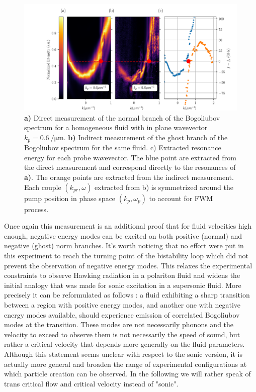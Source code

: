 \begin{figure}
    \centering
    \includegraphics[width=1\textwidth]{chap_custom_st/fig/supersonic_homogenous.pdf}
    \caption{\textbf{a)} Direct measurement of the normal branch of the Bogoliubov spectrum for a homogeneous fluid with in plane wavevector $k_p=\SI{0.6}{\per \micro \meter}.$ \textbf{b)} Indirect measurement of the ghost branch of the Bogoliubov spectrum for the same fluid.
    c) Extracted resonance energy for each probe wavevector. The blue point are extracted from the direct measurement and correspond directly to the resonances of \textbf{a)}. The orange points are extracted from the indirect measurement. Each couple $(k_{pr}, \omega)$ extracted from b) is symmetrized around the pump position in phase space $(k_p, \omega_p)$ to account for FWM process.}
    \label{fig:homogeneous_fluid_bogo_ghost}

\end{figure}

Once again this measurement is an additional proof that for fluid velocities high enough, negative energy modes can be excited on both positive (normal) and negative (ghost) norm branches.
It's worth noticing that no effort were put in this experiment to reach the turning point of the bistability loop which did not prevent the observation of negative energy modes. This relaxes 
the experimental constraints to observe Hawking radiation in a polariton fluid and widens the initial analogy that was made for sonic excitation in a supersonic fluid. More precisely it can be reformulated as follows :
a fluid exhibiting a sharp transition between a region with positive energy modes, and another one with negative energy modes available, should experience  emission of correlated Bogoliubov modes at the transition.
These modes are not necessarily phonons and the velocity to exceed to observe them is not necessarily the speed of sound, but rather a critical velocity that depends more generally on the fluid parameters.
Although this statement seems unclear with respect to the sonic version, it is actually more general and broaden the range of experimental configurations at which particle creation can be observed. In the following 
we will rather speak of trans critical flow and critical velocity instead of "sonic".






